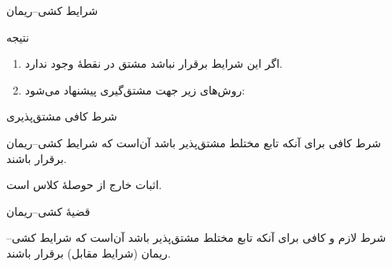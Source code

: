 \begin{EMunit}


\end{EMunit}

\begin{EMimportant}{شرایط کشی--ریمان}


\end{EMimportant}

\begin{EMremark}{نتیجه}

\begin{enumerate}
\def\labelenumi{\arabic{enumi}.}
\tightlist
\item
  اگر این شرایط برقرار نباشد مشتق در نقطهٔ  وجود ندارد.
\item
  روش‌های زیر جهت مشتق‌گیری پیشنهاد می‌شود:
\end{enumerate}

\end{EMremark}

\begin{EMtheorem}{شرط کافی مشتق‌پذیری}

شرط کافی برای آنکه تابع مختلط  مشتق‌پذیر باشد آن‌است که شرایط کشی--ریمان برقرار باشند.

اثبات خارج از حوصلهٔ کلاس است.

\end{EMtheorem}

\begin{EMtheorem}{قضیهٔ کشی--ریمان}

شرط لازم و کافی برای آنکه تابع مختلط  مشتق‌پذیر باشد آن‌است که شرایط کشی--ریمان (شرایط مقابل) برقرار باشند.

\end{EMtheorem}

